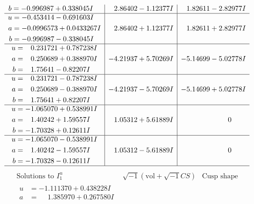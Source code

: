 \documentclass[1p]{elsarticle_modified}
\theoremstyle{definition}
\newcommand{\I}{\sqrt{-1}}
\begin{document}
$$\begin{array}{c|c|c}
\begin{aligned}
b &= -0.996987 + 0.338045 I\end{aligned}
 & \phantom{-}2.86402 - 1.12377 I & \phantom{-}1.82611 - 2.82977 I \\ \hline\begin{aligned}
u &= -0.453414 - 0.691603 I \\
a &= -0.0996573 + 0.0433267 I \\
b &= -0.996987 - 0.338045 I\end{aligned}
 & \phantom{-}2.86402 + 1.12377 I & \phantom{-}1.82611 + 2.82977 I \\ \hline\begin{aligned}
u &= \phantom{-}0.231721 + 0.787238 I \\
a &= \phantom{-}0.250689 + 0.388970 I \\
b &= \phantom{-}1.75641 - 0.82207 I\end{aligned}
 & -4.21937 + 5.70269 I & -5.14699 - 5.02778 I \\ \hline\begin{aligned}
u &= \phantom{-}0.231721 - 0.787238 I \\
a &= \phantom{-}0.250689 - 0.388970 I \\
b &= \phantom{-}1.75641 + 0.82207 I\end{aligned}
 & -4.21937 - 5.70269 I & -5.14699 + 5.02778 I \\ \hline\begin{aligned}
u &= -1.065070 + 0.538991 I \\
a &= \phantom{-}1.40242 + 1.59557 I \\
b &= -1.70328 + 0.12611 I\end{aligned}
 & \phantom{-}1.05312 + 5.61889 I & \phantom{-0.000000 } 0 \\ \hline\begin{aligned}
u &= -1.065070 - 0.538991 I \\
a &= \phantom{-}1.40242 - 1.59557 I \\
b &= -1.70328 - 0.12611 I\end{aligned}
 & \phantom{-}1.05312 - 5.61889 I & \phantom{-0.000000 } 0\\
 \hline 
 \end{array}$$\newpage$$\begin{array}{c|c|c}  
\text{Solutions to }I^u_{1}& \I (\text{vol} + \sqrt{-1}CS) & \text{Cusp shape}\\
 \hline 
\begin{aligned}
u &= -1.111370 + 0.438228 I \\
a &= \phantom{-}1.385970 + 0.267580 I \\

\end{aligned}
\end{array}$$
\end{document}
